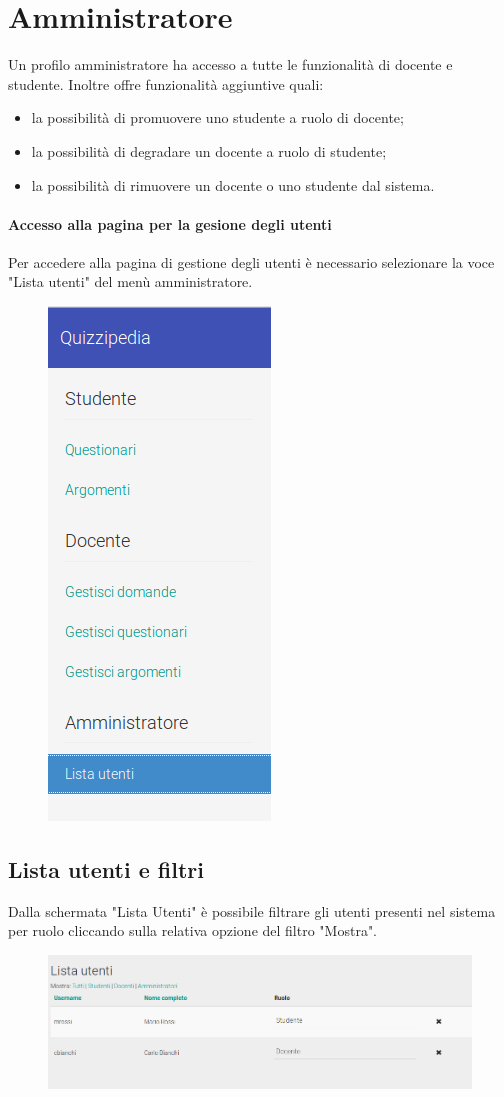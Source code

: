 \documentclass[12pt,a4paper]{article}
\begin{document}
	
		\section{Amministratore}
		Un profilo amministratore ha accesso a tutte le funzionalità di docente e studente.
		Inoltre offre funzionalità aggiuntive quali:
		\begin{itemize}
			\item la possibilità di promuovere uno studente a ruolo di docente;
			\item la possibilità di degradare un docente a ruolo di studente;
			\item la possibilità di rimuovere un docente o uno studente dal sistema.
		\end{itemize}
		\paragraph{Accesso alla pagina per la gesione degli utenti}
		Per accedere alla pagina di gestione degli utenti è necessario selezionare la voce "Lista utenti" del menù amministratore.
		\begin{figure}[h]
			\centering
			\includegraphics[width=0.2\linewidth]{../img/screenshot/usersList_menu.png}
			\caption{}
			\label{Lista utenti}
		\end{figure}
		\subsection{Lista utenti e filtri}
        Dalla schermata "Lista Utenti" è possibile filtrare gli utenti presenti nel sistema per ruolo cliccando sulla relativa opzione del filtro "Mostra".
		\begin{figure}[h]
			
			\centering
			\includegraphics[width=1.0\linewidth]{../img/screenshot/usersList_crop.png}
			\caption{}
			\label{Lista utenti}
		\end{figure}
\end{document}
